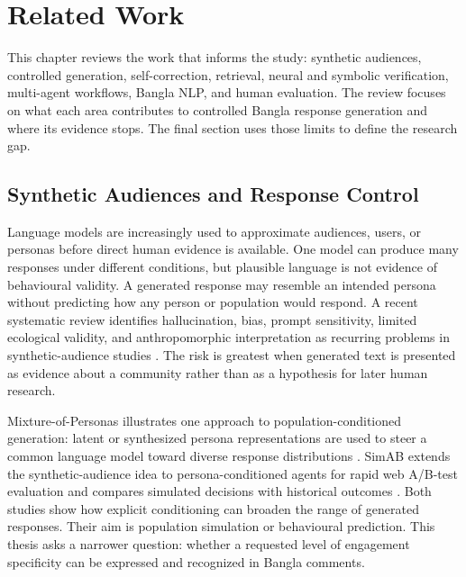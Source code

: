 
\chapter{Related Work}
\label{chap:related-work}

\ifpdf
    \graphicspath{{Chapter2/Figs/Raster/}{Chapter2/Figs/PDF/}{Chapter2/Figs/}{Chapter2/figures/}}
\else
    \graphicspath{{Chapter2/Figs/Vector/}{Chapter2/Figs/}{Chapter2/figures/}}
\fi

This chapter reviews the work that informs the study: synthetic audiences, controlled generation, self-correction, retrieval, neural and symbolic verification, multi-agent workflows, Bangla NLP, and human evaluation. The review focuses on what each area contributes to controlled Bangla response generation and where its evidence stops. The final section uses those limits to define the research gap.

\section{Synthetic Audiences and Response Control}
\label{sec:synthetic-audiences}

Language models are increasingly used to approximate audiences, users, or personas before direct human evidence is available. One model can produce many responses under different conditions, but plausible language is not evidence of behavioural validity. A generated response may resemble an intended persona without predicting how any person or population would respond. A recent systematic review identifies hallucination, bias, prompt sensitivity, limited ecological validity, and anthropomorphic interpretation as recurring problems in synthetic-audience studies \cite{b1}. The risk is greatest when generated text is presented as evidence about a community rather than as a hypothesis for later human research.

Mixture-of-Personas illustrates one approach to population-conditioned generation: latent or synthesized persona representations are used to steer a common language model toward diverse response distributions \cite{b9}. SimAB extends the synthetic-audience idea to persona-conditioned agents for rapid web A/B-test evaluation and compares simulated decisions with historical outcomes \cite{b10}. Both studies show how explicit conditioning can broaden the range of generated responses. Their aim is population simulation or behavioural prediction. This thesis asks a narrower question: whether a requested level of engagement specificity can be expressed and recognized in Bangla comments.

